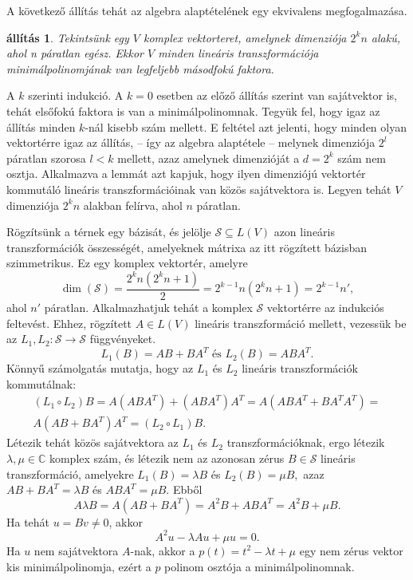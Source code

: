 \documentclass[9pt, a4paper, showtrims]{memoir}
\makeatletter
\renewenvironment{proof}[1][\proofname]
    {\par\pushQED{\qed}%
    \normalfont \topsep6\p@\@plus6\p@\relax
    \trivlist
    \item[\hskip\labelsep
        \itshape
    #1\@addpunct{:}]\ignorespaces}
    {\popQED\endtrivlist\@endpefalse}
\theoremstyle{plain}
\newtheorem{proposition}{állítás}[chapter]
\theoremstyle{remark}
\theoremstyle{definition}
\makeatother
\begin{document}
A következő állítás tehát az algebra alaptételének egy ekvivalens megfogalmazása.
\begin{proposition}
	Tekintsünk egy $V$ komplex vektorteret, amelynek dimenziója $2^kn$ alakú,
	ahol n páratlan egész.
	Ekkor $V$ minden lineáris transzformációja minimálpolinomjának
	van legfeljebb másodfokú faktora.
\end{proposition}
\begin{proof}
	A $k$ szerinti indukció.
	A $k=0$ esetben az előző állítás szerint van sajátvektor is,
	tehát elsőfokú faktora is van a minimálpolinomnak.
	Tegyük fel, hogy igaz az állítás minden $k$-nál kisebb szám mellett.
	E feltétel azt jelenti, hogy minden olyan vektortérre igaz az állítás,
	-- így az algebra alaptétele --
	melynek dimenziója $2^l$ páratlan szorosa $l<k$ mellett,
	azaz amelynek dimenzióját a $d=2^k$ szám nem osztja.
	Alkalmazva a lemmát azt kapjuk, hogy ilyen dimenziójú vektortér kommutáló
	lineáris transzformációinak van közös sajátvektora is.
	Legyen tehát $V$ dimenziója $2^kn$ alakban felírva, ahol $n$ páratlan.

	Rögzítsünk a térnek egy bázisát, és jelölje
	\(
	\mathcal{S}\subseteq L(V)
	\)
	azon lineáris transzformációk összességét,
	amelyeknek mátrixa az itt rögzített bázisban szimmetrikus.
	Ez egy komplex vektortér,
	amelyre
	\[
        \dim\left( \mathcal{S} \right)=
		\frac{2^kn\left( 2^kn+1 \right)}{2}=
		2^{k-1}n\left(2^kn+1  \right)=
		2^{k-1}n',
	\]
	ahol $n'$ páratlan.
	Alkalmazhatjuk tehát a komplex $\mathcal{S}$ vektortérre az indukciós feltevést.
	Ehhez, rögzített $A\in L\left( V \right)$ lineáris transzformáció mellett,
	vezessük be az $L_1,L_2:\mathcal{S}\to\mathcal{S}$ függvényeket.
	\[
		L_1\left( B \right)=AB+BA^T \text{ és }
		L_2\left( B \right)=ABA^T.
	\]
	Könnyű számolgatás mutatja, hogy az $L_1$ és $L_2$ lineáris transzformációk kommutálnak:
	\begin{multline*}
		\left( L_1\circ L_2\right)B=
		A\left( ABA^T \right)+\left( ABA^T \right)A^T=
		A\left( ABA^T+BA^TA^T \right)
		=\\
		A\left( AB+BA^T \right)A^T =
		\left( L_2\circ L_1 \right)B.
	\end{multline*}
	Létezik tehát közös sajátvektora az $L_1$ és $L_2$ transzformációknak, ergo
	létezik $\lambda,\mu\in\mathbb{C}$ komplex szám,
	és létezik nem az azonosan zérus $B\in\mathcal{S}$ lineáris transzformáció,
	amelyekre
	$
		L_1\left( B \right)=\lambda B
	$
	és
	$
		L_2\left( B \right)=\mu B,
	$
	azaz
	$
		AB+BA^T=\lambda B
	$
	és
	$
		ABA^T=\mu B.
	$
	Ebből
	\[
		A\lambda B=
		A\left( AB+BA^T \right)=
		A^2B + ABA^T=
		A^2B + \mu B.
	\]
	Ha tehát $u=Bv\neq 0$, akkor
	\[
		A^2u-\lambda Au+\mu u=0.
	\]
	Ha $u$ nem sajátvektora $A$-nak, akkor a
	$p\left( t \right)=t^2-\lambda t+\mu$
	egy nem zérus vektor kis minimálpolinomja,
	ezért a $p$ polinom osztója a minimálpolinomnak.
\end{proof}
\end{document}
